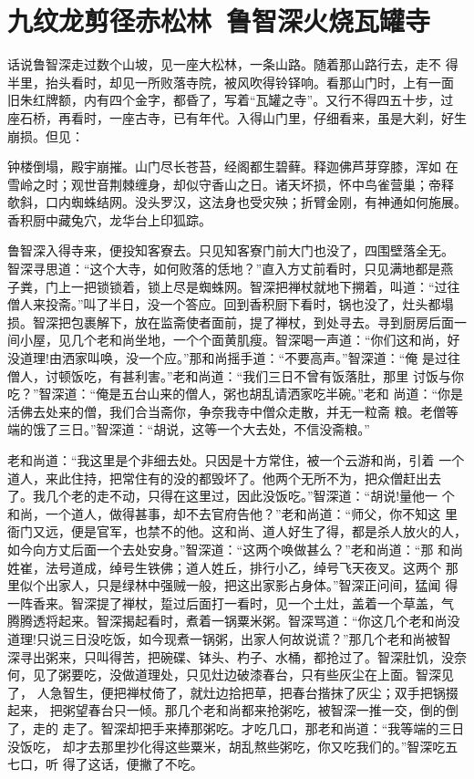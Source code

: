 \chapter{九纹龙剪径赤松林~鲁智深火烧瓦罐寺}

话说鲁智深走过数个山坡，见一座大松林，一条山路。随着那山路行去，走不
得半里，抬头看时，却见一所败落寺院，被风吹得铃铎响。看那山门时，上有一面
旧朱红牌额，内有四个金字，都昏了，写着“瓦罐之寺”。又行不得四五十步，过
座石桥，再看时，一座古寺，已有年代。入得山门里，仔细看来，虽是大刹，好生
崩损。但见：

钟楼倒塌，殿宇崩摧。山门尽长苍苔，经阁都生碧藓。释迦佛芦芽穿膝，浑如
在雪岭之时；观世音荆棘缠身，却似守香山之日。诸天坏损，怀中鸟雀营巢；帝释
欹斜，口内蜘蛛结网。没头罗汉，这法身也受灾殃；折臂金刚，有神通如何施展。
香积厨中藏兔穴，龙华台上印狐踪。

鲁智深入得寺来，便投知客寮去。只见知客寮门前大门也没了，四围壁落全无。
智深寻思道：“这个大寺，如何败落的恁地？”直入方丈前看时，只见满地都是燕
子粪，门上一把锁锁着，锁上尽是蜘蛛网。智深把禅杖就地下搠着，叫道：“过往
僧人来投斋。”叫了半日，没一个答应。回到香积厨下看时，锅也没了，灶头都塌
损。智深把包裹解下，放在监斋使者面前，提了禅杖，到处寻去。寻到厨房后面一
间小屋，见几个老和尚坐地，一个个面黄肌瘦。智深喝一声道：“你们这和尚，好
没道理!由洒家叫唤，没一个应。”那和尚摇手道：“不要高声。”智深道：“俺
是过往僧人，讨顿饭吃，有甚利害。”老和尚道：“我们三日不曾有饭落肚，那里
讨饭与你吃？”智深道：“俺是五台山来的僧人，粥也胡乱请洒家吃半碗。”老和
尚道：“你是活佛去处来的僧，我们合当斋你，争奈我寺中僧众走散，并无一粒斋
粮。老僧等端的饿了三日。”智深道：“胡说，这等一个大去处，不信没斋粮。”

老和尚道：“我这里是个非细去处。只因是十方常住，被一个云游和尚，引着
一个道人，来此住持，把常住有的没的都毁坏了。他两个无所不为，把众僧赶出去
了。我几个老的走不动，只得在这里过，因此没饭吃。”智深道：“胡说!量他一
个和尚，一个道人，做得甚事，却不去官府告他？”老和尚道：“师父，你不知这
里衙门又远，便是官军，也禁不的他。这和尚、道人好生了得，都是杀人放火的人，
如今向方丈后面一个去处安身。”智深道：“这两个唤做甚么？”老和尚道：“那
和尚姓崔，法号道成，绰号生铁佛；道人姓丘，排行小乙，绰号飞天夜叉。这两个
那里似个出家人，只是绿林中强贼一般，把这出家影占身体。”智深正问间，猛闻
得一阵香来。智深提了禅杖，踅过后面打一看时，见一个土灶，盖着一个草盖，气
腾腾透将起来。智深揭起看时，煮着一锅粟米粥。智深骂道：“你这几个老和尚没
道理!只说三日没吃饭，如今现煮一锅粥，出家人何故说谎？”那几个老和尚被智
深寻出粥来，只叫得苦，把碗碟、钵头、杓子、水桶，都抢过了。智深肚饥，没奈
何，见了粥要吃，没做道理处，只见灶边破漆春台，只有些灰尘在上面。智深见了，
人急智生，便把禅杖倚了，就灶边拾把草，把春台揩抹了灰尘；双手把锅掇起来，
把粥望春台只一倾。那几个老和尚都来抢粥吃，被智深一推一交，倒的倒了，走的
走了。智深却把手来捧那粥吃。才吃几口，那老和尚道：“我等端的三日没饭吃，
却才去那里抄化得这些粟米，胡乱熬些粥吃，你又吃我们的。”智深吃五七口，听
得了这话，便撇了不吃。

